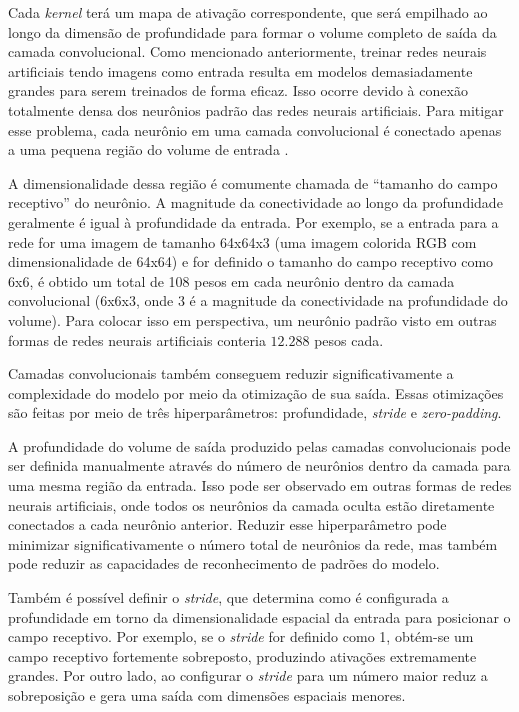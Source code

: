 Cada \textit{kernel} terá um mapa de ativação correspondente, que será empilhado ao longo da dimensão de profundidade para formar o volume completo de saída da camada convolucional. Como mencionado anteriormente, treinar redes neurais artificiais tendo imagens como entrada resulta em modelos demasiadamente grandes para serem treinados de forma eficaz. Isso ocorre devido à conexão totalmente densa dos neurônios padrão das redes neurais artificiais. Para mitigar esse problema, cada neurônio em uma camada convolucional é conectado apenas a uma pequena região do volume de entrada \cite{osheaIntroductionConvolutionalNeural2015c}. 

A dimensionalidade dessa região é comumente chamada de ``tamanho do campo receptivo'' do neurônio. A magnitude da conectividade ao longo da profundidade geralmente é igual à profundidade da entrada. Por exemplo, se a entrada para a rede for uma imagem de tamanho 64x64x3 (uma imagem colorida RGB com dimensionalidade de 64x64) e for definido o tamanho do campo receptivo como 6x6, é obtido um total de 108 pesos em cada neurônio dentro da camada convolucional (6x6x3, onde 3 é a magnitude da conectividade na profundidade do volume). Para colocar isso em perspectiva, um neurônio padrão visto em outras formas de redes neurais artificiais conteria $12.288$ pesos cada. 

Camadas convolucionais também conseguem reduzir significativamente a complexidade do modelo por meio da otimização de sua saída. Essas otimizações são feitas por meio de três hiperparâmetros: profundidade, \textit{stride} e \textit{zero-padding}. 

A profundidade do volume de saída produzido pelas camadas convolucionais pode ser definida manualmente através do número de neurônios dentro da camada para uma mesma região da entrada. Isso pode ser observado em outras formas de redes neurais artificiais, onde todos os neurônios da camada oculta estão diretamente conectados a cada neurônio anterior. Reduzir esse hiperparâmetro pode minimizar significativamente o número total de neurônios da rede, mas também pode reduzir as capacidades de reconhecimento de padrões do modelo. 

Também é possível definir o \textit{stride}, que determina como é configurada a profundidade em torno da dimensionalidade espacial da entrada para posicionar o campo receptivo. Por exemplo, se o \textit{stride} for definido como 1, obtém-se um campo receptivo fortemente sobreposto, produzindo ativações extremamente grandes. Por outro lado, ao configurar o \textit{stride} para um número maior reduz a sobreposição e gera uma saída com dimensões espaciais menores.  

